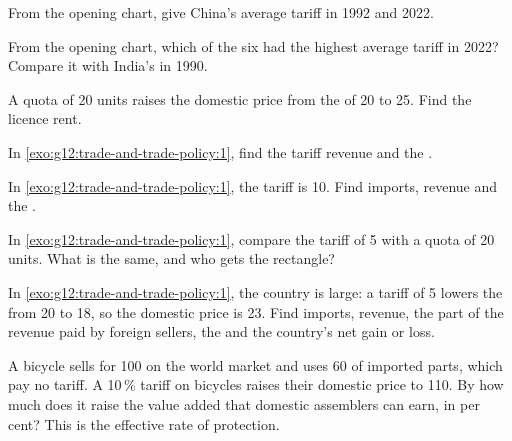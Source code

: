 \begin{exercise}[$\star$]\label{exo:g12:trade-and-trade-policy:3}
From the opening chart, give China's average tariff in 1992 and 2022.
\end{exercise}

\begin{exercise}[$\star$]\label{exo:g12:trade-and-trade-policy:4}
From the opening chart, which of the six had the highest average tariff in 2022? Compare it with India's in 1990.
\end{exercise}

\begin{exercise}[$\star$]\label{exo:g12:trade-and-trade-policy:5}
A quota of 20 units raises the domestic price from the  of 20 to 25. Find the licence rent.
\end{exercise}

\begin{exercise}[$\star\star$]\label{exo:g12:trade-and-trade-policy:6}
In \cref{exo:g12:trade-and-trade-policy:1}, find the tariff revenue and the .
\end{exercise}

\begin{exercise}[$\star\star$]\label{exo:g12:trade-and-trade-policy:7}
In \cref{exo:g12:trade-and-trade-policy:1}, the tariff is 10. Find imports, revenue and the .
\end{exercise}

\begin{exercise}[$\star\star$]\label{exo:g12:trade-and-trade-policy:8}
In \cref{exo:g12:trade-and-trade-policy:1}, compare the tariff of 5 with a quota of 20 units. What is the same, and who gets the rectangle?
\end{exercise}

\begin{exercise}[$\star\star$]\label{exo:g12:trade-and-trade-policy:9}
In \cref{exo:g12:trade-and-trade-policy:1}, the country is large: a tariff of 5 lowers the  from 20 to 18, so the domestic price is 23. Find imports, revenue, the
part of the revenue paid by foreign sellers, the  and the country's net gain or loss.
\end{exercise}

\begin{exercise}[$\star\star$]\label{exo:g12:trade-and-trade-policy:10}
A bicycle sells for 100 on the world market and uses 60 of imported parts, which pay no tariff. A 10\,\% tariff on bicycles raises their domestic price to 110. By how much
does it raise the value added that domestic assemblers can earn, in per cent? This is the effective rate of protection.
\end{exercise}

